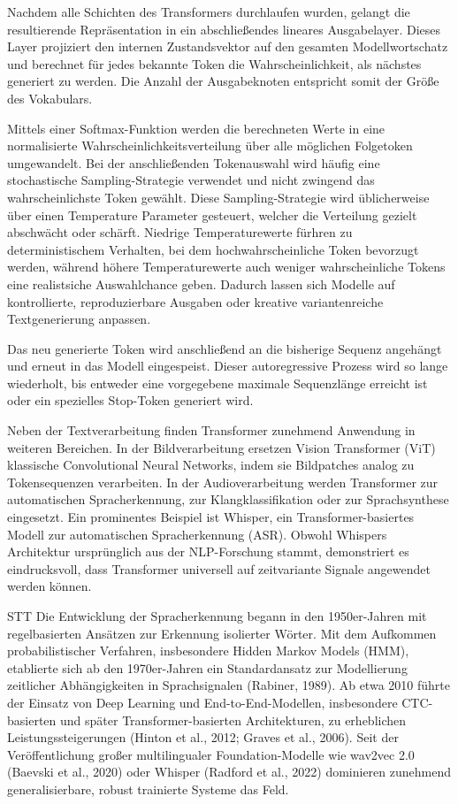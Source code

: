 Nachdem alle Schichten des Transformers durchlaufen wurden, gelangt die resultierende Repräsentation in ein abschließendes lineares Ausgabelayer. Dieses Layer projiziert den internen Zustandsvektor auf den gesamten Modellwortschatz und berechnet für jedes bekannte Token die Wahrscheinlichkeit, als nächstes generiert zu werden. Die Anzahl der Ausgabeknoten entspricht somit der Größe des Vokabulars.

Mittels einer Softmax-Funktion werden die berechneten Werte in eine normalisierte Wahrscheinlichkeitsverteilung über alle möglichen Folgetoken umgewandelt. Bei der anschließenden Tokenauswahl wird häufig eine stochastische Sampling-Strategie verwendet und nicht zwingend das wahrscheinlichste Token gewählt. Diese Sampling-Strategie wird üblicherweise über einen Temperature Parameter gesteuert, welcher die Verteilung gezielt abschwächt oder schärft. Niedrige Temperaturewerte fürhren zu deterministischem Verhalten, bei dem hochwahrscheinliche Token bevorzugt werden, während höhere Temperaturewerte auch weniger wahrscheinliche Tokens eine realistsiche Auswahlchance geben. Dadurch lassen sich Modelle auf kontrollierte, reproduzierbare Ausgaben oder kreative variantenreiche Textgenerierung anpassen.

Das neu generierte Token wird anschließend an die bisherige Sequenz angehängt und erneut in das Modell eingespeist. Dieser autoregressive Prozess wird so lange wiederholt, bis entweder eine vorgegebene maximale Sequenzlänge erreicht ist oder ein spezielles Stop-Token generiert wird.

Neben der Textverarbeitung finden Transformer zunehmend Anwendung in weiteren Bereichen. In der Bildverarbeitung ersetzen Vision Transformer (ViT) klassische Convolutional Neural Networks, indem sie Bildpatches analog zu Tokensequenzen verarbeiten. In der Audioverarbeitung werden Transformer zur automatischen Spracherkennung, zur Klangklassifikation oder zur Sprachsynthese eingesetzt. Ein prominentes Beispiel ist Whisper, ein Transformer-basiertes Modell zur automatischen Spracherkennung (ASR). Obwohl Whispers Architektur ursprünglich aus der NLP-Forschung stammt, demonstriert es eindrucksvoll, dass Transformer universell auf zeitvariante Signale angewendet werden können.

STT
Die Entwicklung der Spracherkennung begann in den 1950er-Jahren mit regelbasierten Ansätzen zur Erkennung isolierter Wörter. Mit dem Aufkommen probabilistischer Verfahren, insbesondere Hidden Markov Models (HMM), etablierte sich ab den 1970er-Jahren ein Standardansatz zur Modellierung zeitlicher Abhängigkeiten in Sprachsignalen (Rabiner, 1989). Ab etwa 2010 führte der Einsatz von Deep Learning und End-to-End-Modellen, insbesondere CTC-basierten und später Transformer-basierten Architekturen, zu erheblichen Leistungssteigerungen (Hinton et al., 2012; Graves et al., 2006). Seit der Veröffentlichung großer multilingualer Foundation-Modelle wie wav2vec 2.0 (Baevski et al., 2020) oder Whisper (Radford et al., 2022) dominieren zunehmend generalisierbare, robust trainierte Systeme das Feld.

